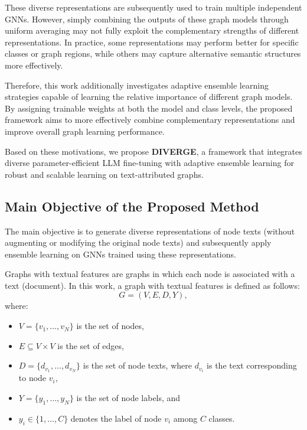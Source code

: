 \documentclass[a4paper,fleqn]{cas-sc}
\begin{document}
These diverse representations are subsequently used to train multiple independent GNNs. However, simply combining the outputs of these graph models through uniform averaging may not fully exploit the complementary strengths of different representations. In practice, some representations may perform better for specific classes or graph regions, while others may capture alternative semantic structures more effectively.

Therefore, this work additionally investigates adaptive ensemble learning strategies capable of learning the relative importance of different graph models. By assigning trainable weights at both the model and class levels, the proposed framework aims to more effectively combine complementary representations and improve overall graph learning performance.

Based on these motivations, we propose \textbf{DIVERGE}, a framework that integrates diverse parameter-efficient LLM fine-tuning with adaptive ensemble learning for robust and scalable learning on text-attributed graphs.




\subsection{Main Objective of the Proposed Method}
The main objective is to generate diverse representations of node texts (without augmenting or modifying the original node texts) and subsequently apply ensemble learning on GNNs trained using these representations.

Graphs with textual features are graphs in which each node is associated with a text (document). In this work, a graph with textual features is defined as follows:
\begin{equation}
G = (V, E, D, Y),
\end{equation}
where:
\begin{itemize}
\item $V=\{v_1,\dots,v_N\}$ is the set of nodes,
\item $E \subseteq V\times V$ is the set of edges,
\item $D=\{d_{v_1},\dots,d_{v_N}\}$ is the set of node texts, where $d_{v_i}$ is the text corresponding to node $v_i$,
\item $Y=\{y_1,\dots,y_N\}$ is the set of node labels, and
\item $y_i \in \{1,\dots,C\}$ denotes the label of node $v_i$ among $C$ classes.
\end{itemize}
\end{document}
